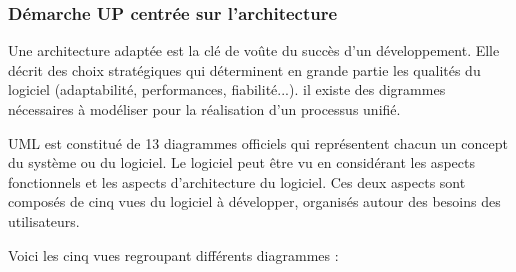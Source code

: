             \subsubsection[Démarche UP centrée sur l’architecture]{Démarche UP centrée sur l’architecture}
            Une architecture adaptée est la clé de voûte du succès d'un développement. Elle décrit
            des choix stratégiques qui déterminent en grande partie les qualités du logiciel (adaptabilité,
            performances, fiabilité...). \cite{diga2001uml}
            il existe des digrammes nécessaires à modéliser pour la réalisation d’un processus unifié.
            \par
            UML est constitué de 13 diagrammes officiels qui représentent chacun un concept du
            système ou du logiciel. Le logiciel peut être vu en considérant les aspects fonctionnels et
            les aspects d’architecture du logiciel. Ces deux aspects sont composés de cinq vues du
            logiciel à développer, organisés autour des besoins des utilisateurs.
            \par            
            Voici les cinq vues regroupant différents diagrammes :
